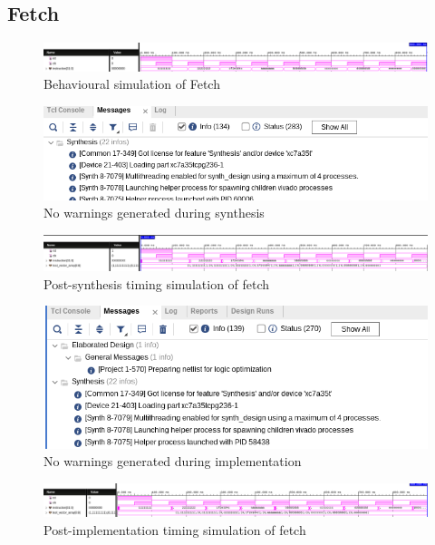 \documentclass[CMPE]{../KGCOEReport}
\begin{document}
    \subsection*{Fetch}
    \begin{figure}[h!]
        \centering
        \includegraphics[width=\textwidth]{img/behavior_fetch}
        \caption{Behavioural simulation of Fetch}
        \label{fig:demo1}
	\end{figure}
    \begin{figure}[h!]
        \centering
        \includegraphics[width=\textwidth]{img/warning_synth_fetch}
        \caption{No warnings generated during synthesis}
        \label{fig:demo1}
	\end{figure}
    \begin{figure}[h!]
        \centering
        \includegraphics[width=\textwidth]{img/synthesis_fetch}
        \caption{Post-synthesis timing simulation of fetch}
        \label{fig:demo1}
	\end{figure}
    \begin{figure}[h!]
        \centering
        \includegraphics[width=\textwidth]{img/warning_impl_fetch}
        \caption{No warnings generated during implementation}
        \label{fig:demo1}
	\end{figure}
    \begin{figure}[h!]
        \centering
        \includegraphics[width=\textwidth]{img/impl_fetch}
        \caption{Post-implementation timing simulation of fetch}
        \label{fig:demo1}
	\end{figure}
	
\end{document}
